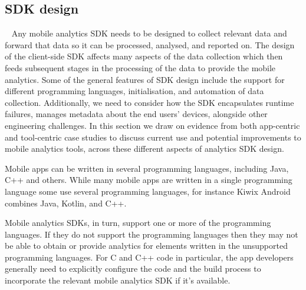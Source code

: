 \subsection{SDK design}~\label{tata-section-sdk-design}
Any mobile analytics SDK needs to be designed to collect relevant data and forward that data so it can be processed, analysed, and reported on. The design of the client-side SDK affects many aspects of the data collection which then feeds subsequent stages in the processing of the data to provide the mobile analytics. Some of the general features of SDK design include the support for different programming languages, initialisation, and automation of data collection. Additionally, we need to consider how the SDK encapsulates runtime failures, manages metadata about the end users' devices, alongside other engineering challenges. In this section we draw on evidence from both app-centric and tool-centric case studies to discuss current use and potential improvements to mobile analytics tools, across these different aspects of analytics SDK design.

Mobile apps can be written in several programming languages, including Java, C++ and others. While many mobile apps are written in a single programming language some use several programming languages, for instance Kiwix Android combines Java, Kotlin, and C++. 

Mobile analytics SDKs, in turn, support one or more of the programming languages. If they do not support the programming languages then they may not be able to obtain or provide analytics for elements written in the unsupported programming languages. For C and C++ code in particular, the app developers generally need to explicitly configure the code and the build process to incorporate the relevant mobile analytics SDK if it's available. %



